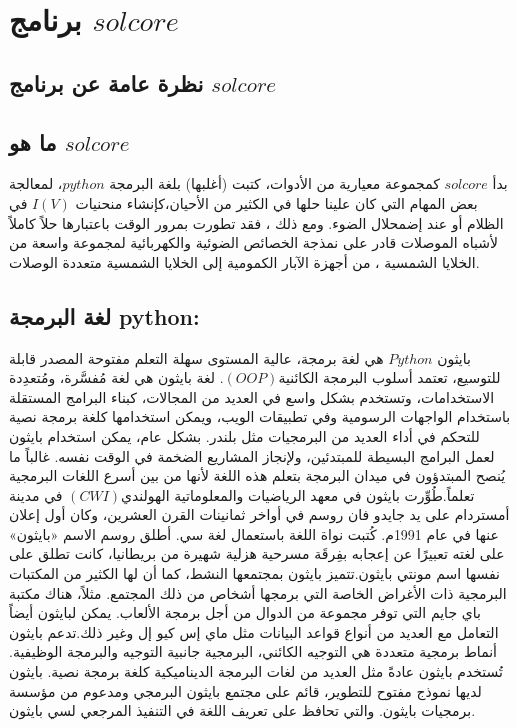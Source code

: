 
\chapter{برنامج $ solcore $}

\label{Chapter2} 





\section*{نظرة عامة عن برنامج $ solcore $}

\section{ما هو $ solcore $}
بدأ $ solcore $ كمجموعة معيارية من الأدوات، كتبت (أغلبها) بلغة البرمجة $ python $، لمعالجة بعض المهام التي كان علينا حلها في الكثير من الأحيان،كإنشاء منحنيات $ I(V) $ في الظلام أو عند إضمحلال الضوء. ومع ذلك ، فقد تطورت بمرور الوقت باعتبارها حلاً كاملاً لأشباه الموصلات قادر على نمذجة الخصائص الضوئية والكهربائية لمجموعة واسعة من الخلايا الشمسية ، من أجهزة الآبار الكمومية إلى الخلايا الشمسية متعددة الوصلات.
\section{لغة البرمجة python:}

بايثون  $ Python $‏ هي لغة برمجة، عالية المستوى سهلة التعلم مفتوحة المصدر قابلة للتوسيع، تعتمد أسلوب البرمجة الكائنية$  (OOP) $. لغة بايثون هي لغة مُفسَّرة، ومُتعدِدة الاستخدامات، وتستخدم بشكل واسع في العديد من المجالات، كبناء البرامج المستقلة باستخدام الواجهات الرسومية وفي تطبيقات الويب، ويمكن استخدامها كلغة برمجة نصية للتحكم في أداء العديد من البرمجيات مثل بلندر. بشكل عام، يمكن استخدام بايثون لعمل البرامج البسيطة للمبتدئين، ولإنجاز المشاريع الضخمة في الوقت نفسه. غالباً ما يُنصح المبتدؤون في ميدان البرمجة بتعلم هذه اللغة لأنها من بين أسرع اللغات البرمجية تعلماً.طُوِّرت بايثون في معهد الرياضيات والمعلوماتية الهولندي$  (CWI) $ في مدينة أمستردام على يد جايدو فان روسم في أواخر ثمانينات القرن العشرين، وكان أول إعلان عنها في عام 1991م. كُتبت نواة اللغة باستعمال لغة سي. أطلق روسم الاسم «بايثون» على لغته تعبيرًا عن إعجابه بفِرقَة مسرحية هزلية شهيرة من بريطانيا، كانت تطلق على نفسها اسم مونتي بايثون.تتميز بايثون بمجتمعها النشط، كما أن لها الكثير من المكتبات البرمجية ذات الأغراض الخاصة التي برمجها أشخاص من ذلك المجتمع. مثلاً، هناك مكتبة باي جايم التي توفر مجموعة من الدوال من أجل برمجة الألعاب. يمكن لبايثون أيضاً التعامل مع العديد من أنواع قواعد البيانات مثل ماي إس كيو إل وغير ذلك.تدعم بايثون أنماط برمجية متعددة هي التوجيه الكائني، البرمجية جانبية التوجيه والبرمجة الوظيفية. تُستخدم بايثون عادةً مثل العديد من لغات البرمجة الديناميكية كلغة برمجة نصية. بايثون لديها نموذج مفتوح للتطوير، قائم على مجتمع بايثون البرمجي ومدعوم من مؤسسة برمجيات بايثون. والتي تحافظ على تعريف اللغة في التنفيذ المرجعي لسي بايثون. 



